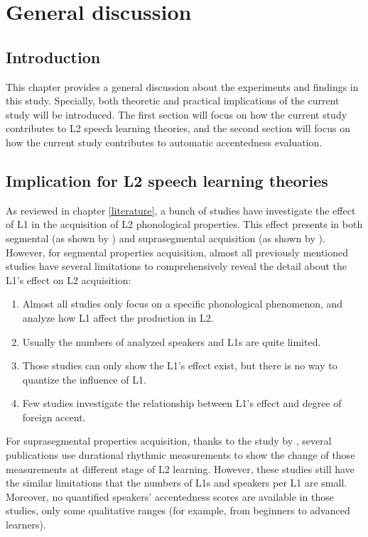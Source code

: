 \chapter{General discussion}
\label{discussion}

\section{Introduction}

This chapter provides a general discussion about the experiments and findings in this study. Specially, both theoretic and practical implications of the current study will be introduced. The first section will focus on how the current study contributes to L2 speech learning theories, and the second section will focus on how the current study contributes to automatic accentedness evaluation.

\section{Implication for L2 speech learning theories}

As reviewed in chapter \ref{literature}, a bunch of studies have investigate the effect of L1 in the acquisition of L2 phonological properties. This effect presents in both segmental (as shown by \cite{strange1992learning, flege1987production, chang2008phonetic, munro1993productions, derakhshan2015interference}) and suprasegmental acquisition (as shown by \cite{mennen2004bi, stockmal2005measures, white2007calibrating, lin2008interlanguage, li2014l2, ordin2015acquisition}). However, for segmental properties acquisition, almost all previously mentioned studies have several limitations to comprehensively reveal the detail about the L1's effect on L2 acquisition:

\begin{enumerate}
\item Almost all studies only focus on a specific phonological phenomenon, and analyze how L1 affect the production in L2.
\item Usually the numbers of analyzed speakers and L1s are quite limited.
\item Those studies can only show the L1's effect exist, but there is no way to quantize the influence of L1.
\item Few studies investigate the relationship between L1's effect and degree of foreign accent.
\end{enumerate}

For suprasegmental properties acquisition, thanks to the study by \cite{ramus1999correlates,grabe2002durational}, several publications use durational rhythmic measurements to show the change of those measurements at different stage of L2 learning. However, these studies still have the similar limitations that the numbers of L1s and speakers per L1 are small. Moreover, no quantified speakers' accentedness scores are available in those studies, only some qualitative ranges (for example, from beginners to advanced learners).

